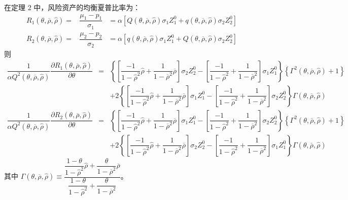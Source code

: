\documentclass[10.0pt]{article}
\begin{document}
\quad

在定理 2 中，风险资产的均衡夏普比率为：
{\footnotesize \begin{eqnarray*}
R_1 (\theta, \overline{\rho}, {\hat \rho}) = & \dfrac{\mu_1 - p_1}{\sigma_1} & = \alpha \left[ Q (\theta, \overline{\rho}, {\hat \rho}) \sigma_1 Z_1^0 + q (\theta, \overline{\rho}, {\hat \rho}) \sigma_2 Z_2^0 \right] \\
R_2 (\theta, \overline{\rho}, {\hat \rho}) = & \dfrac{\mu_2 - p_2}{\sigma_2} & = \alpha \left[ q (\theta, \overline{\rho}, {\hat \rho}) \sigma_1 Z_1^0 + Q (\theta, \overline{\rho}, {\hat \rho}) \sigma_2 Z_2^0 \right]
\end{eqnarray*}}
则
{\footnotesize \begin{eqnarray*}
\dfrac{1}{\alpha Q^2 (\theta, \overline{\rho}, {\hat \rho})} \dfrac{\partial R_1 (\theta, \overline{\rho}, {\hat \rho})}{\partial \theta} & = & \left\{ \left[ \dfrac{- 1}{1 - {\hat \rho}^2} {\hat \rho} + \dfrac1{1 - \overline{\rho}^2} \overline{\rho} \right] \sigma_2 Z_2^0 - \left[ \dfrac{- 1}{1 - {\hat \rho}^2} + \dfrac1{1 - \overline{\rho}^2} \right] \sigma_1 Z_1^0 \right\} \left\{ \Gamma^2 (\theta, \overline{\rho}, {\hat \rho}) + 1 \right\} \\
& & + 2 \left\{ \left[ \dfrac{- 1}{1 - {\hat \rho}^2} {\hat \rho} + \dfrac1{1 - \overline{\rho}^2} \overline{\rho} \right] \sigma_1 Z_1^0 - \left[ \dfrac{- 1}{1 - {\hat \rho}^2} + \dfrac1{1 - \overline{\rho}^2} \right] \sigma_2 Z_2^0 \right\} \Gamma (\theta, \overline{\rho}, {\hat \rho}) \\
\dfrac{1}{\alpha Q^2 (\theta, \overline{\rho}, {\hat \rho})} \dfrac{\partial R_2 (\theta, \overline{\rho}, {\hat \rho})}{\partial \theta} & = & \left\{ \left[ \dfrac{- 1}{1 - {\hat \rho}^2} {\hat \rho} + \dfrac1{1 - \overline{\rho}^2} \overline{\rho} \right] \sigma_1 Z_1^0 - \left[ \dfrac{- 1}{1 - {\hat \rho}^2} + \dfrac1{1 - \overline{\rho}^2} \right] \sigma_2 Z_2^0 \right\} \left\{ \Gamma^2 (\theta, \overline{\rho}, {\hat \rho}) + 1 \right\} \\
& & + 2 \left\{ \left[ \dfrac{- 1}{1 - {\hat \rho}^2} {\hat \rho} + \dfrac1{1 - \overline{\rho}^2} \overline{\rho} \right] \sigma_2 Z_2^0 - \left[ \dfrac{- 1}{1 - {\hat \rho}^2} + \dfrac1{1 - \overline{\rho}^2} \right] \sigma_1 Z_1^0 \right\} \Gamma (\theta, \overline{\rho}, {\hat \rho})
\end{eqnarray*}}
其中 {\footnotesize $ \Gamma (\theta, \overline{\rho}, {\hat \rho}) \equiv \dfrac{\dfrac{1 - \theta}{1 - {\hat \rho}^2} {\hat \rho} + \dfrac{\theta}{1 - \overline{\rho}^2} \overline{\rho}}{\dfrac{1 - \theta}{1 - {\hat \rho}^2} + \dfrac{\theta}{1 - \overline{\rho}^2}} $}。
\end{document}
